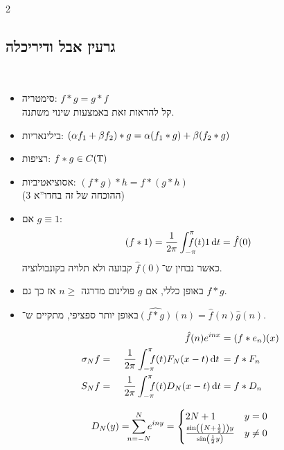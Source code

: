 \documentclass[]{../../../tex/classes/styledArticle}
\begin{document}
\begin{multicols}{2}
		\subsection{גרעין אבל ודיריכלה}
			\begin{Claim}[תכונות הקונבלוציה]\
				\begin{itemize}
					\item סימטריה: \hfil $f * g = g * f$ \\
					קל להראות זאת באמצעות שינוי משתנה.
					\item בילינאריות: \hfil $\left ( \alpha f_1 + \beta f_2 \right ) * g = \alpha (f_1 * g) + \beta (f_2 * g)$
					\item רציפות: \hfil $f * g \in C(\mathbb{T})$
					\item אסוציאטיביות: \hfil $(f * g) * h = f * (g * h)$\\
					(ההוכחה של זה בחדו''א 3)
					\item אם $g \equiv 1$:
					\[ (f * 1) = \frac{1}{2\pi}\int^{\pi}_{-\pi}\!\!\!\!\!\! f(t) 1 \,\mathrm{d}t = \hat f(0) \]
					כאשר נבחין ש־$\hat f(0)$ קבועה ולא תלויה בקונבולוציה.
					\item באופן כללי, אם $g$ פולינום מדרגה $n \ge$ אז כך גם $f * g$.
					\item באופן יותר ספציפי, מתקיים ש־$\widehat{(f * g)}(n) = \hat f (n) \hat g(n)$. 
				\end{itemize}
			\end{Claim}
			
			
			\begin{Claim}\label{clm:1}
				\begin{alignat*}{9}
					&& \hat f(n) e^{inx} &= (f * e_n)(x) \\
					\sg_N f &=& \frac{1}{2\pi}\int^{\pi}_{-\pi}\dequad \ f(t)F_N(x - t)\dt\, &= f * F_n \\
					S_Nf &=& \ \frac{1}{2\pi}\int^{\pi}_{-\pi}\dequad \ f(t){D_N(x - t)}\dt &= f * D_n
				\end{alignat*}
			\end{Claim}
			\begin{Lemma}
				\[ D_N(y) = \sum_{\mathclap{n = -N}}^{N}e^{iny} = \begin{cases}
					2N + 1 & y = 0 \\
					\frac{\sin\cl{\cl{N + \frac{1}{2}}}y}{\sin\cl{\frac{1}{2}y}} & y \neq 0
				\end{cases} \]
			\end{Lemma}
			

\end{multicols}
\end{document}
